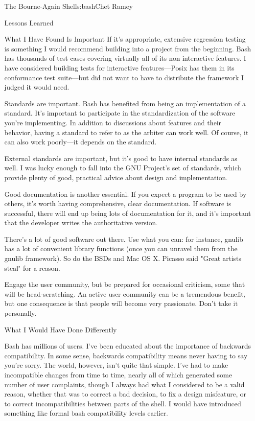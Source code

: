\begin{aosachapter}{The Bourne-Again Shell}{s:bash}{Chet Ramey}
\begin{aosasect1}{Lessons Learned}
\begin{aosasect2}{What I Have Found Is Important}
If it's appropriate, extensive regression testing is something I would
recommend building into a project from the beginning.  Bash has
thousands of test cases covering virtually all of its non-interactive
features. I have considered building tests for interactive
features---Posix has them in its conformance test suite---but did not
want to have to distribute the framework I judged it would need.

Standards are important.  Bash has benefited from being an
implementation of a standard.  It's important to participate in the
standardization of the software you're implementing.  In addition to
discussions about features and their behavior, having a standard to
refer to as the arbiter can work well.  Of course, it can also work poorly---it
depends on the standard.

External standards are important, but it's good to have
internal standards as well.  I was lucky enough to fall into the GNU
Project's set of standards, which provide plenty of good, practical
advice about design and implementation.

Good documentation is another essential.  If you expect a program to
be used by others, it's worth having comprehensive, clear
documentation.  If software is successful, there will end up being
lots of documentation for it, and it's important that the developer
writes the authoritative version.

There's a lot of good software out there.  Use what you can: for
instance, gnulib has a lot of convenient library functions (once you
can unravel them from the gnulib framework).  So do the BSDs and Mac
OS X\@.  Picasso said "Great artists steal" for a reason.

Engage the user community, but be prepared for occasional criticism,
some that will be head-scratching.  An active user community can be a
tremendous benefit, but one consequence is that people will become
very passionate.  Don't take it personally.

\end{aosasect2}

\begin{aosasect2}{What I Would Have Done Differently}

Bash has millions of users.  I've been educated about the importance
of backwards compatibility.  In some sense, backwards compatibility
means never having to say you're sorry.  The world, however, isn't
quite that simple.  I've had to make incompatible changes from time to
time, nearly all of which generated some number of user complaints,
though I always had what I considered to be a valid reason, whether
that was to correct a bad decision, to fix a design misfeature, or to
correct incompatibilities between parts of the shell.  I would have
introduced something like formal bash compatibility levels
earlier.


\end{aosasect2}
\end{aosasect1}
\end{aosachapter}
